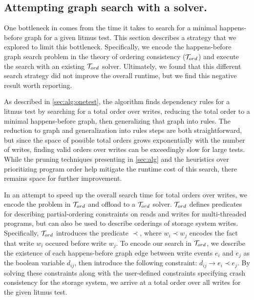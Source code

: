 \subsection{Attempting graph search with a \tord solver.}
One bottleneck in \depsynth
comes from the time it takes to search for a minimal
happens-before graph for a given litmus test.
This section describes a strategy that we explored to limit this bottleneck.
Specifically, we encode the happens-before graph search problem
in the theory of ordering consistency ($\mathcal{T}_{ord}$) \cite{n:tord}
and execute the search with an existing $\mathcal{T}_{ord}$ solver.
Ultimately, we found that this different search strategy did not 
improve the overall runtime, but we find this negative
result worth reporting.

As described in \cref{sec:alg:onetest}, the  algorithm
finds dependency rules for a litmus test by searching for a total order over writes,
reducing the total order to a minimal happens-before graph,
then generalizing that graph into rules.
The reduction to graph and generalization into rules steps are both straightforward,
but since the space of possible total orders grows exponentially with the number of writes,
finding valid orders over writes can be exceedingly slow for large tests.
While the pruning techniques presenting in \cref{sec:alg}
and the heuristics over prioritizing program order help mitigate the runtime cost of this search,
there remains space for further improvement.

In an attempt to speed up the overall search time for total orders over writes,
we encode the problem in $\mathcal{T}_{ord}$ and offload to a $\mathcal{T}_{ord}$ solver.
$\mathcal{T}_{ord}$ defines predicates for describing partial-ordering constraints
on reads and writes for multi-threaded programs, %
but can also be used to describe orderings of storage system writes.
Specifically, $\mathcal{T}_{ord}$ introduces the predicate $\prec$, where
$ w_i \prec w_j $ encodes the fact that write $w_i$ occured before
write $w_j$.
To encode our search in $\mathcal{T}_{ord}$,
we describe the existence of each happens-before graph edge
between write events $e_i$ and $e_j$ as the boolean variable $d_{ij}$,
then introduce the following constraint: $ d_{ij} \rightarrow e_i \prec e_j $.
By solving these constraints along with the user-defined constraints specifying
crash consistency for the storage system, we arrive at a total order over all
writes for the given litmus test.

